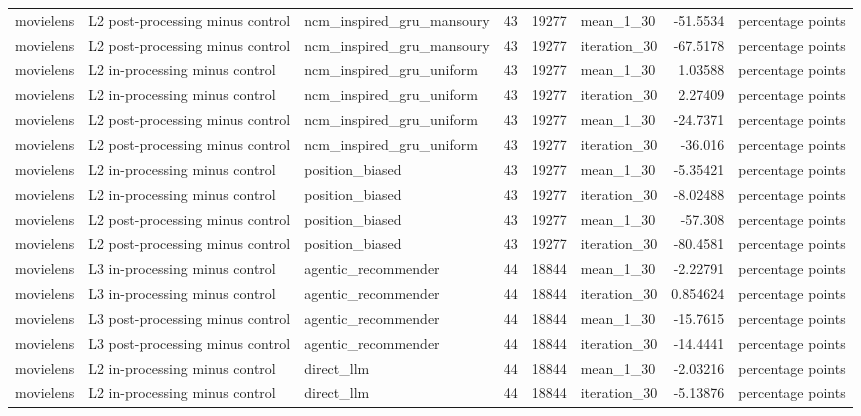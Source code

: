 \begin{table}[htbp!]
\begin{tabular}{lllrrlrl}
movielens & L2 post-processing minus control & ncm\_inspired\_gru\_mansoury & 43 & 19277 & mean\_1\_30 & -51.5534 & percentage points \\
movielens & L2 post-processing minus control & ncm\_inspired\_gru\_mansoury & 43 & 19277 & iteration\_30 & -67.5178 & percentage points \\
movielens & L2 in-processing minus control & ncm\_inspired\_gru\_uniform & 43 & 19277 & mean\_1\_30 & 1.03588 & percentage points \\
movielens & L2 in-processing minus control & ncm\_inspired\_gru\_uniform & 43 & 19277 & iteration\_30 & 2.27409 & percentage points \\
movielens & L2 post-processing minus control & ncm\_inspired\_gru\_uniform & 43 & 19277 & mean\_1\_30 & -24.7371 & percentage points \\
movielens & L2 post-processing minus control & ncm\_inspired\_gru\_uniform & 43 & 19277 & iteration\_30 & -36.016 & percentage points \\
movielens & L2 in-processing minus control & position\_biased & 43 & 19277 & mean\_1\_30 & -5.35421 & percentage points \\
movielens & L2 in-processing minus control & position\_biased & 43 & 19277 & iteration\_30 & -8.02488 & percentage points \\
movielens & L2 post-processing minus control & position\_biased & 43 & 19277 & mean\_1\_30 & -57.308 & percentage points \\
movielens & L2 post-processing minus control & position\_biased & 43 & 19277 & iteration\_30 & -80.4581 & percentage points \\
movielens & L3 in-processing minus control & agentic\_recommender & 44 & 18844 & mean\_1\_30 & -2.22791 & percentage points \\
movielens & L3 in-processing minus control & agentic\_recommender & 44 & 18844 & iteration\_30 & 0.854624 & percentage points \\
movielens & L3 post-processing minus control & agentic\_recommender & 44 & 18844 & mean\_1\_30 & -15.7615 & percentage points \\
movielens & L3 post-processing minus control & agentic\_recommender & 44 & 18844 & iteration\_30 & -14.4441 & percentage points \\
movielens & L2 in-processing minus control & direct\_llm & 44 & 18844 & mean\_1\_30 & -2.03216 & percentage points \\
movielens & L2 in-processing minus control & direct\_llm & 44 & 18844 & iteration\_30 & -5.13876 & percentage points \\

\end{tabular}
\end{table}
